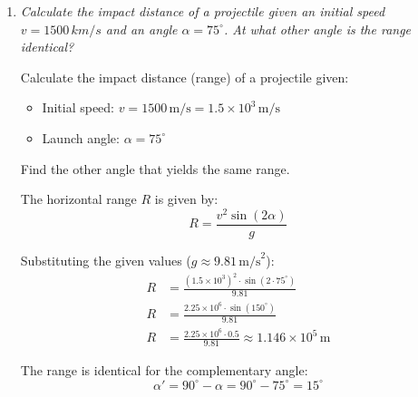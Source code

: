 \documentclass[a4paper,12pt]{letter}
\begin{document}
\begin{enumerate}
\begin{center}
\end{center}

The maximum range is achieved at a launch angle of \textbf{45 degrees}. At this angle, the range formula becomes $R_{max} = \frac{v^2}{g}$.


\item \textit{Calculate the impact distance of a projectile given an initial speed $v=1500\,km/s$ and an angle $\alpha=75^{\circ}$. At what other angle is the range identical?}

\medskip
  
Calculate the impact distance (range) of a projectile given:
\begin{itemize}
    \item Initial speed: $v = 1500\,\text{m/s} = 1.5 \times 10^3\,\text{m/s}$
    \item Launch angle: $\alpha = 75^\circ$
\end{itemize}
Find the other angle that yields the same range.

The horizontal range $R$ is given by:
\begin{equation}
    R = \frac{v^2 \sin(2\alpha)}{g}
\end{equation}

Substituting the given values ($g \approx 9.81\,\text{m/s}^2$):
\begin{align*}
    R &= \frac{(1.5 \times 10^3)^2 \cdot \sin(2 \cdot 75^\circ)}{9.81} \\
    R &= \frac{2.25 \times 10^{6} \cdot \sin(150^\circ)}{9.81} \\
    R &= \frac{2.25 \times 10^{6} \cdot 0.5}{9.81} \approx 1.146 \times 10^{5}\,\text{m}
\end{align*}

The range is identical for the complementary angle:
\begin{equation}
    \alpha' = 90^\circ - \alpha = 90^\circ - 75^\circ = 15^\circ
\end{equation}


\end{enumerate}
\end{document}

